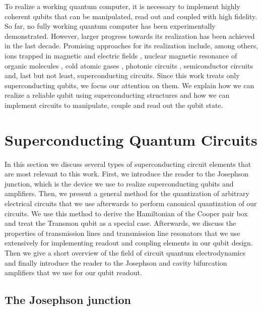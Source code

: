 To realize a working quantum computer, it is necessary to implement highly coherent qubits that can be manipulated, read out and coupled with high fidelity. So far, no fully working quantum computer has been experimentally demonstrated. However, larger progress towards its realization has been achieved in the last decade. Promising approaches for its realization include, among others, ions trapped in magnetic and electric fields \citep{monroe_demonstration_1995,cirac_quantum_1995}, nuclear magnetic resonance of organic molecules \citep{jones_nmr_2001,vandersypen_experimental_2001}, cold atomic gases \citep{briegel_quantum_2000}, photonic circuits \citep{knill_scheme_2001}, semiconductor circuits \citep{loss_quantum_1998} and, last but not least, superconducting circuits. Since this work treats only superconducting qubits, we focus our attention on them. We explain how we can realize a reliable qubit using superconducting structures and how we can implement circuits to manipulate, couple and read out the qubit state.

\section{Superconducting Quantum Circuits}

In this section we discuss several types of superconducting circuit elements that are most relevant to this work. First, we introduce the reader to the Josephson junction, which is the device we use to realize superconducting qubits and amplifiers. Then, we present a general method for the quantization of arbitrary electrical circuits that we use afterwards to perform canonical quantization of our circuits. We use this method to derive the Hamiltonian of the Cooper pair box and treat the Transmon qubit as a special case. Afterwards, we discuss the properties of transmission lines and transmission line resonators that we use extensively for implementing readout and coupling elements in our qubit design. Then we give a short overview of the field of circuit quantum electrodynamics and finally introduce the reader to the Josephson and cavity bifurcation amplifiers that we use for our qubit readout.

\subsection{The Josephson junction}

